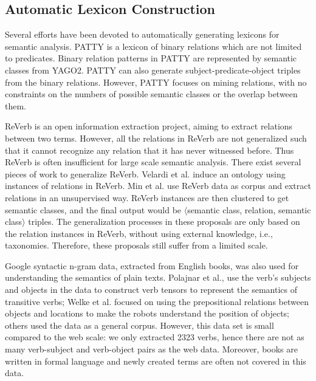 \subsection{Automatic Lexicon Construction}
Several efforts have been devoted to automatically
generating lexicons for semantic analysis.
PATTY\cite{nakashole2012patty} is a lexicon of binary relations
which are not limited to predicates.
Binary relation patterns in PATTY are represented by
semantic classes from YAGO2\cite{SuchanekKW07}.
PATTY can also generate subject-predicate-object triples from
the binary relations\cite{nakashole2013discovering}. However, PATTY
focuses on mining relations, with no constraints on the
numbers of possible semantic classes or the overlap between
them.

ReVerb is an open information extraction project, aiming to
extract relations between two terms. However, all the relations in
ReVerb are not generalized such that it cannot recognize any
relation that it has never witnessed before. Thus ReVerb
is often insufficient for large scale semantic analysis.
There exist several pieces of work to generalize ReVerb.
Velardi et al.\cite{velardi2013open} induce an ontology
using instances of relations in ReVerb.
Min et al.\cite{min2012ensemble} use ReVerb data
as corpus and extract relations in an unsupervised way.
ReVerb instances are then clustered to get semantic classes,
and the final output would be $\langle$semantic class,
relation, semantic class$\rangle$ triples.
The generalization processes in these proposals are only based
on the relation instances in ReVerb, without using external
knowledge, i.e., taxonomies. Therefore, these proposals still suffer
from a limited scale.


Google syntactic n-gram data, extracted from English books,
was also used for understanding the semantics of plain texts.
Polajnar et al.\cite{polajnar2013learning}, use the
verb's subjects and objects in the data
to construct verb tensors to represent the semantics
of transitive verbs; Welke et al.\cite{welkegrounded} focused
on using the prepositional relations between objects and locations
to make the robots understand the position of objects; others
\cite{borin2013mining,riedlscaling,kaiserextracting}
used the data as a general corpus. 
However, this
data set is small compared to the web scale: we only extracted
2323 verbs, hence there are not as many verb-subject and verb-object pairs
as the web data. Moreover, books are written in formal
language and newly created terms are often not covered in this data.

